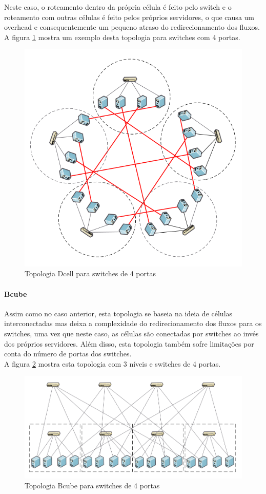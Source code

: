 \documentclass[12pt,a4paper]{report}
\begin{document}
Neste caso, o roteamento dentro da própria célula é feito pelo switch e o roteamento com outras células é feito pelos próprios servidores, o que causa um overhead e consequentemente um pequeno atraso do redirecionamento dos fluxos.\\

A figura \ref{dcell} mostra um exemplo desta topologia para switches com 4 portas.\\

\begin{figure}[H]
\centering
\includegraphics[width=.8\textwidth]{imagens/dcell.png}
\caption{Topologia Dcell para switches de 4 portas}
\label{dcell}
\end{figure}

\paragraph{Bcube}
Assim como no caso anterior, esta topologia se baseia na ideia de células interconectadas mas deixa a complexidade do redirecionamento dos fluxos para os switches, uma vez que neste caso, as células são conectadas por switches ao invés dos próprios servidores. Além disso, esta topologia também sofre limitações por conta do número de portas dos switches.\\

A figura \ref{bcube} mostra esta topologia com 3 níveis e switches de 4 portas.\\

\begin{figure}[H]
\centering
\includegraphics[width=.8\textwidth]{imagens/bcube.png}
\caption{Topologia Bcube para switches de 4 portas}
\label{bcube}
\end{figure}
\end{document}

